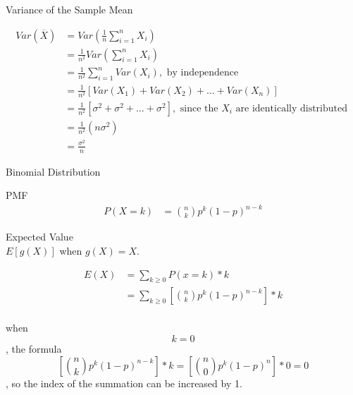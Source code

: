 \documentclass[]{article}
\begin{document}
Variance of the Sample Mean

\begin{align}
Var\left({\overline{X}}\right)&=Var\left( \frac{1}{n}\sum_{i=1}^nX_i\right)\\&= \frac{1}{n^2}Var\left( \sum_{i=1}^nX_i\right)\\&=\frac{1}{n^2}\sum_{i=1}^nVar(X_i), \text{ by independence}\\&= \frac{1}{n^2}\left[Var(X_1)+Var(X_2)+\ldots+Var(X_n) \right]\\&=\frac{1}{n^2}\left[\sigma^2+\sigma^2+\ldots+\sigma^2  \right], \text{ since the }X_i \text{ are identically distributed }\\&= \frac{1}{n^2}(n\sigma^2)\\&=\frac{\sigma^2}{n}\end{align}

Binomial Distribution

PMF
\begin{align}
P(X=k) &= \binom{n} {k} p^k (1-p)^{n-k}
\end{align}


Expected Value\\

$E[g(X)]$ when $g(X) = X$.

\begin{align}
E(X) &= \sum_{k \geqslant 0}P(x=k)*k\\
&= \sum_{k \geqslant 0}[\binom{n} {k} p^k (1-p)^{n-k}] * k\\
\end{align}

when $$k=0$$, the formula $$[\binom{n} {k} p^k (1-p)^{n-k}] * k = [\binom{n} {0} p^k (1-p)^n] * 0 = 0$$, so the index of the summation can be increased by 1.
\end{document}
